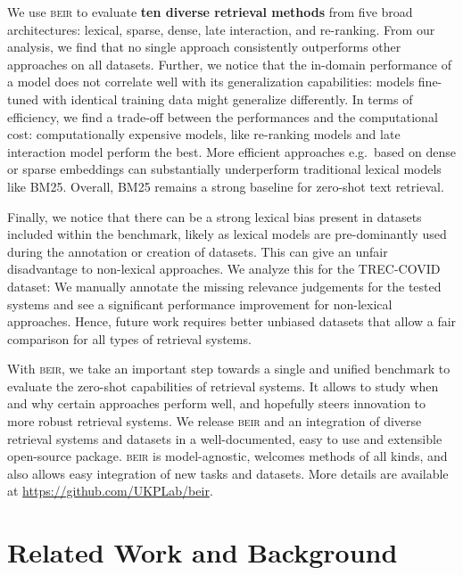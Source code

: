 \documentclass{article}
\newcommand{\custo}[1]{\textsc{\normalsize #1}}
\newcommand{\beir}{\custo{beir}\xspace}
\begin{document}
We use \beir to evaluate \textbf{ten diverse retrieval methods} from five broad architectures: lexical, sparse, dense, late interaction, and re-ranking. From our analysis, we find that no single approach consistently outperforms other approaches on all datasets. Further, we notice that the in-domain performance of a model does not correlate well with its generalization capabilities: models fine-tuned with identical training data might generalize differently. In terms of efficiency, we find a trade-off between the performances and the computational cost: computationally expensive models, like re-ranking models and late interaction model perform the best. More efficient approaches e.g.\ based on dense or sparse embeddings can substantially underperform traditional lexical models like BM25. Overall, BM25 remains a strong baseline for zero-shot text retrieval.

Finally, we notice that there can be a strong lexical bias present in datasets included within the benchmark, likely as lexical models are pre-dominantly used during the annotation or creation of datasets. This can give an unfair disadvantage to non-lexical approaches. We analyze this for the TREC-COVID \cite{10.1145/3451964.3451965} dataset: We manually annotate the missing relevance judgements for the tested systems and see a significant performance improvement for non-lexical approaches. Hence, future work requires better unbiased datasets that allow a fair comparison for all types of retrieval systems.  

With \beir, we take an important step towards a single and unified benchmark to evaluate the zero-shot capabilities of retrieval systems. It allows to study when and why certain approaches perform well, and hopefully steers innovation to more robust retrieval systems. We release \beir and an integration of diverse retrieval systems and datasets in a well-documented, easy to use and extensible open-source package. \beir is model-agnostic, welcomes methods of all kinds, and also allows easy integration of new tasks and datasets. More details are available at \url{https://github.com/UKPLab/beir}.

\vspace{-2mm}
\section{Related Work and Background}
\vspace{-2mm}
\end{document}
